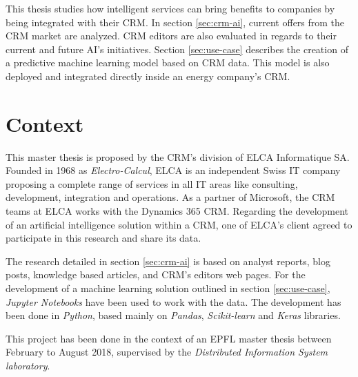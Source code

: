 This thesis studies how intelligent services can bring benefits to companies by being integrated with their CRM. In section \ref{sec:crm-ai}, current offers from the CRM market are analyzed. CRM editors are also evaluated in regards to their current and future AI's initiatives. Section \ref{sec:use-case} describes the creation of a predictive machine learning model based on CRM data. This model is also deployed and integrated directly inside an energy company's CRM.


\section{Context}
This master thesis is proposed by the CRM's division of ELCA Informatique SA. Founded in 1968 as \textit{Electro-Calcul}, ELCA is an independent Swiss IT company proposing a complete range of services in all IT areas like consulting, development, integration and operations. As a partner of Microsoft, the CRM teams at ELCA works with the Dynamics 365 CRM. Regarding the development of an artificial intelligence solution within a CRM, one of ELCA's client agreed to participate in this research and share its data.

The research detailed in section \ref{sec:crm-ai} is based on analyst reports, blog posts, knowledge based articles, and CRM's editors web pages. For the development of a machine learning solution outlined in section \ref{sec:use-case}, \textit{Jupyter Notebooks} have been used to work with the data. The development has been done in \textit{Python}, based mainly on \textit{Pandas}, \textit{Scikit-learn} and \textit{Keras} libraries.

This project has been done in the context of an EPFL master thesis between February to August 2018, supervised by the \textit{Distributed Information System laboratory}.